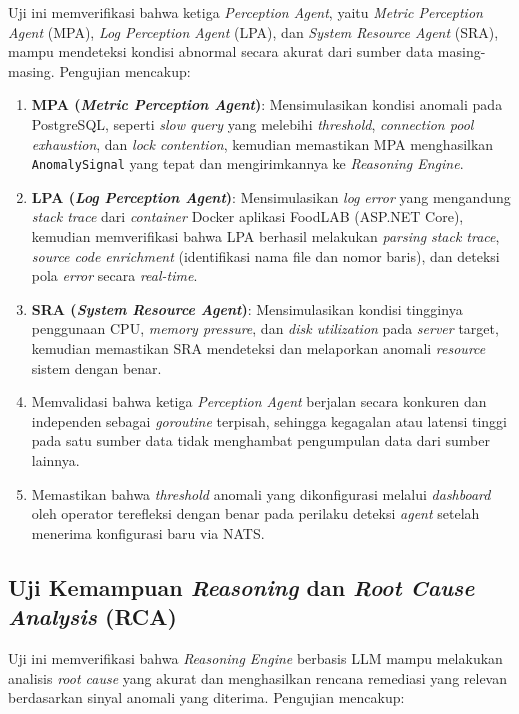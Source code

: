 Uji ini memverifikasi bahwa ketiga \textit{Perception Agent}, yaitu \textit{Metric Perception Agent} (MPA), \textit{Log Perception Agent} (LPA), dan \textit{System Resource Agent} (SRA), mampu mendeteksi kondisi abnormal secara akurat dari sumber data masing-masing. Pengujian mencakup:

\begin{enumerate}[label=\arabic*., leftmargin=*]
  \item \textbf{MPA (\textit{Metric Perception Agent})}: Mensimulasikan kondisi anomali pada PostgreSQL, seperti \textit{slow query} yang melebihi \textit{threshold}, \textit{connection pool exhaustion}, dan \textit{lock contention}, kemudian memastikan MPA menghasilkan \texttt{AnomalySignal} yang tepat dan mengirimkannya ke \textit{Reasoning Engine}.
  \item \textbf{LPA (\textit{Log Perception Agent})}: Mensimulasikan \textit{log} \textit{error} yang mengandung \textit{stack trace} dari \textit{container} Docker aplikasi FoodLAB (ASP.NET Core), kemudian memverifikasi bahwa LPA berhasil melakukan \textit{parsing} \textit{stack trace}, \textit{source code enrichment} (identifikasi nama file dan nomor baris), dan deteksi pola \textit{error} secara \textit{real-time}.
  \item \textbf{SRA (\textit{System Resource Agent})}: Mensimulasikan kondisi tingginya penggunaan CPU, \textit{memory pressure}, dan \textit{disk utilization} pada \textit{server} target, kemudian memastikan SRA mendeteksi dan melaporkan anomali \textit{resource} sistem dengan benar.
  \item Memvalidasi bahwa ketiga \textit{Perception Agent} berjalan secara konkuren dan independen sebagai \textit{goroutine} terpisah, sehingga kegagalan atau latensi tinggi pada satu sumber data tidak menghambat pengumpulan data dari sumber lainnya.
  \item Memastikan bahwa \textit{threshold} anomali yang dikonfigurasi melalui \textit{dashboard} oleh operator terefleksi dengan benar pada perilaku deteksi \textit{agent} setelah menerima konfigurasi baru via NATS.
\end{enumerate}

\subsection{Uji Kemampuan \textit{Reasoning} dan \textit{Root Cause Analysis} (RCA)}

Uji ini memverifikasi bahwa \textit{Reasoning Engine} berbasis LLM mampu melakukan analisis \textit{root cause} yang akurat dan menghasilkan rencana remediasi yang relevan berdasarkan sinyal anomali yang diterima. Pengujian mencakup:

